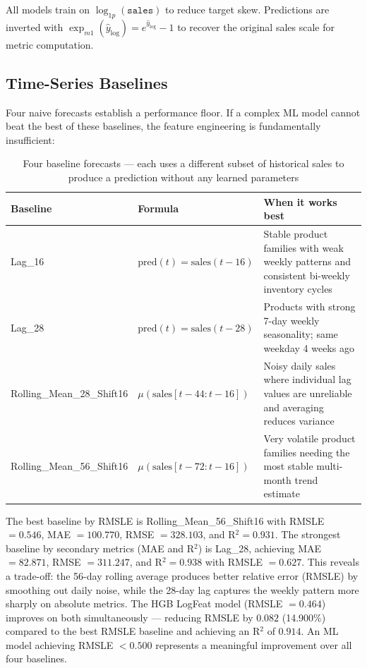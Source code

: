 All models train on $\log_{1p}(\texttt{sales})$ to reduce target skew. Predictions are inverted with $\exp_{m1}(\hat{y}_{\log}) = e^{\hat{y}_{\log}} - 1$ to recover the original sales scale for metric computation.

\subsection{Time-Series Baselines}

Four naive forecasts establish a performance floor. If a complex ML model cannot beat the best of these baselines, the feature engineering is fundamentally insufficient:

\begin{table}[H]
\centering{}
\begin{tabular}{l L{4cm} L{4.5cm}}
\toprule{}\color{white}\textbf{Baseline} &\color{white}\textbf{Formula} &\color{white}\textbf{When it works best}\\
\midrule
Lag\_16 & $\text{pred}(t) = \text{sales}(t-16)$ & Stable product families with weak weekly patterns and consistent bi-weekly inventory cycles\\
Lag\_28 & $\text{pred}(t) = \text{sales}(t-28)$ & Products with strong 7-day weekly seasonality; same weekday 4 weeks ago\\
Rolling\_Mean\_28\_Shift16 & $\mu(\text{sales}[t-44:t-16])$ & Noisy daily sales where individual lag values are unreliable and averaging reduces variance\\
Rolling\_Mean\_56\_Shift16 & $\mu(\text{sales}[t-72:t-16])$ & Very volatile product families needing the most stable multi-month trend estimate\\
\bottomrule
\end{tabular}
\caption{Four baseline forecasts — each uses a different subset of historical sales to produce a prediction without any learned parameters}
\end{table}

The best baseline by RMSLE is Rolling\_Mean\_56\_Shift16 with RMSLE $= 0.546$, MAE $= 100.770$, RMSE $= 328.103$, and R$^2 = 0.931$. The strongest baseline by secondary metrics (MAE and R$^2$) is Lag\_28, achieving MAE $= 82.871$, RMSE $= 311.247$, and R$^2 = 0.938$ with RMSLE $= 0.627$. This reveals a trade-off: the 56-day rolling average produces better relative error (RMSLE) by smoothing out daily noise, while the 28-day lag captures the weekly pattern more sharply on absolute metrics. The HGB LogFeat model (RMSLE $= 0.464$) improves on both simultaneously — reducing RMSLE by $0.082$ (14.900\%) compared to the best RMSLE baseline and achieving an R$^2$ of $0.914$. An ML model achieving RMSLE $< 0.500$ represents a meaningful improvement over all four baselines.

